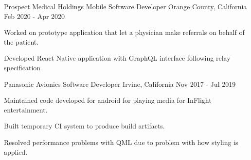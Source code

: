 \begin{cventries}
    \cventry
    {Prospect Medical Holdings} %
    {Mobile Software Developer} %
    {Orange County, California} %
    {Feb 2020 - Apr 2020} %
    {
      \begin{cvitems} %
         \item {Worked on prototype application that let a physician make referrals on behalf of the patient.}
         \item{Developed React Native application with GraphQL interface following relay specification}
      \end{cvitems}
    }
    


    \cventry
    {Panasonic Avionics} %
    {Software Developer} %
    {Irvine, California} %
    {Nov 2017 - Jul 2019} %
    {
      \begin{cvitems} %
         \item{Maintained code developed for android for playing media for InFlight entertainment.} 
         \item{Built temporary CI system to produce build artifacts.} 
         \item{Resolved performance problems with QML due to problem with how styling is applied.} 
      \end{cvitems}
    }
    
    


\end{cventries}
